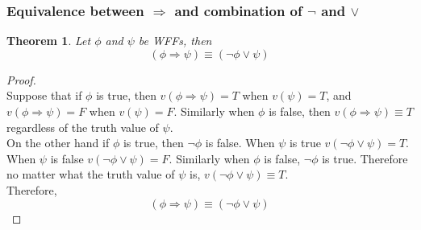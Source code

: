 \documentclass[11pt]{article}
\theoremstyle{definition}
\newtheorem{theorem}{Theorem}[subsection]
\begin{document}
\subsubsection{Equivalence between $\Rightarrow$ and combination of $\neg$ and $\vee$}
\begin{shaded}
    \begin{theorem}
        \textit{Let $\phi$ and $\psi$ be WFFs, then}
        \begin{equation}
            (\phi \Rightarrow \psi) \equiv (\neg \phi \vee \psi) \label{Rightarrowreplacement}
        \end{equation}
    \end{theorem}
\end{shaded}
\begin{proof}
    \quad \\
    Suppose that if $\phi$ is true, then $v(\phi \Rightarrow \psi)=T$ when $v(\psi)=T$, and $v(\phi \Rightarrow \psi)=F$ when $v(\psi)=F$. Similarly when $\phi$ is false,  then $v(\phi \Rightarrow \psi) \equiv T$ regardless of the truth value of $\psi$.\\
    On the other hand if $\phi$ is true, then $\neg \phi$ is false. When $\psi$ is true $v(\neg \phi \vee \psi)=T$. When $\psi$ is false  $v(\neg \phi \vee \psi)=F$. Similarly when $\phi$ is false, $\neg \phi$ is true. Therefore no matter what the truth value of $\psi$ is, $v(\neg \phi \vee \psi) \equiv T$.\\
    Therefore, 
    \begin{equation}
        (\phi \Rightarrow \psi) \equiv (\neg \phi \vee \psi)
    \end{equation}
\end{proof}
\end{document}
